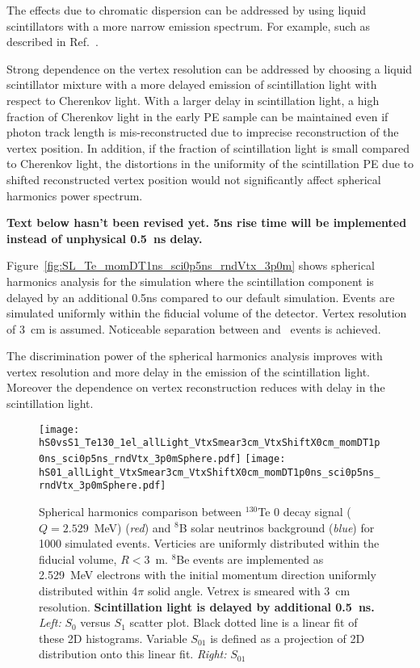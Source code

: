 The effects due to chromatic dispersion can be addressed by using liquid scintillators with a more narrow emission spectrum. For example,
such as described in Ref.~\cite{LS_narrow_emission}.

Strong dependence on the vertex resolution can be addressed by choosing a liquid scintillator mixture with a more delayed emission 
of scintillation light with respect to Cherenkov light. With a larger delay in scintillation light, a high fraction of Cherenkov light 
in the early PE sample can be maintained even if photon track length is mis-reconstructed due to imprecise reconstruction of the vertex 
position. In addition, if the fraction of scintillation light is small compared to Cherenkov light, the distortions in the uniformity of 
the scintillation PE due to shifted reconstructed vertex position would not significantly affect spherical harmonics power spectrum.


\textbf{Text below hasn't been revised yet. 5ns rise time will be implemented instead of unphysical 0.5~ns delay.}

Figure~\ref{fig:SL_Te_momDT1ns_sci0p5ns_rndVtx_3p0m} shows
spherical harmonics analysis for the simulation where the
scintillation component is delayed by an additional 0.5ns compared to our default simulation. Events are simulated uniformly within the fiducial volume of the detector. Vertex resolution of 3~cm is assumed. Noticeable separation between \nbb and \B~events is achieved.

The discrimination power of the spherical harmonics analysis improves with vertex resolution and more delay in the emission of the scintillation light. Moreover the dependence on vertex reconstruction reduces with delay in the scintillation light. 

\begin{figure*}[h]
  \centering
  \texttt{[image: hS0vsS1\_Te130\_1el\_allLight\_VtxSmear3cm\_VtxShiftX0cm\_momDT1p0ns\_sci0p5ns\_rndVtx\_3p0mSphere.pdf]}
  \texttt{[image: hS01\_allLight\_VtxSmear3cm\_VtxShiftX0cm\_momDT1p0ns\_sci0p5ns\_rndVtx\_3p0mSphere.pdf]}
  \caption{Spherical harmonics comparison between $^{130}$Te 0{\nbb}
    decay signal ($Q=2.529$~MeV) (\emph{red}) and $^{8}$B solar
    neutrinos background (\emph{blue}) for 1000 simulated
    events. Verticies are uniformly distributed within the fiducial
    volume, $R<3$~m. $^8$Be events are implemented as 2.529~MeV
    electrons with the initial momentum direction uniformly
    distributed within 4$\pi$ solid angle. Vetrex is smeared with 3~cm
    resolution. {\bf Scintillation light is delayed by additional
      0.5~ns.} \emph{Left:} $S_0$ versus $S_1$ scatter plot. Black dotted
    line is a linear fit of these 2D histograms. Variable $S_{01}$ is
    defined as a projection of 2D distribution onto this linear
    fit. \emph{Right:} $S_{01}$}
\label{fig:SL_Te_SmearX3cm_momDT1ns_sci0p5ns_rndVtx_3p0m}
\end{figure*}


